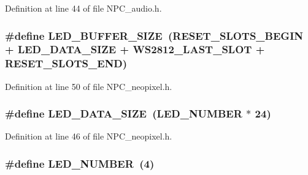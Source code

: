 Definition at line 44 of file N\+P\+C\+\_\+audio.\+h.

\subsubsection[{\texorpdfstring{L\+E\+D\+\_\+\+B\+U\+F\+F\+E\+R\+\_\+\+S\+I\+ZE}{LED_BUFFER_SIZE}}]{\setlength{\rightskip}{0pt plus 5cm}\#define L\+E\+D\+\_\+\+B\+U\+F\+F\+E\+R\+\_\+\+S\+I\+ZE~({\bf R\+E\+S\+E\+T\+\_\+\+S\+L\+O\+T\+S\+\_\+\+B\+E\+G\+IN} + {\bf L\+E\+D\+\_\+\+D\+A\+T\+A\+\_\+\+S\+I\+ZE} + {\bf W\+S2812\+\_\+\+L\+A\+S\+T\+\_\+\+S\+L\+OT} + {\bf R\+E\+S\+E\+T\+\_\+\+S\+L\+O\+T\+S\+\_\+\+E\+ND})}\hypertarget{group___constant_ga398165d967d8a2c8ff57ddd0a081a5ff}{}\label{group___constant_ga398165d967d8a2c8ff57ddd0a081a5ff}


Definition at line 50 of file N\+P\+C\+\_\+neopixel.\+h.

\subsubsection[{\texorpdfstring{L\+E\+D\+\_\+\+D\+A\+T\+A\+\_\+\+S\+I\+ZE}{LED_DATA_SIZE}}]{\setlength{\rightskip}{0pt plus 5cm}\#define L\+E\+D\+\_\+\+D\+A\+T\+A\+\_\+\+S\+I\+ZE~({\bf L\+E\+D\+\_\+\+N\+U\+M\+B\+ER} $\ast$ 24)}\hypertarget{group___constant_ga7af472c9efcf021651c589bb54d103fa}{}\label{group___constant_ga7af472c9efcf021651c589bb54d103fa}


Definition at line 46 of file N\+P\+C\+\_\+neopixel.\+h.

\subsubsection[{\texorpdfstring{L\+E\+D\+\_\+\+N\+U\+M\+B\+ER}{LED_NUMBER}}]{\setlength{\rightskip}{0pt plus 5cm}\#define L\+E\+D\+\_\+\+N\+U\+M\+B\+ER~(4)}\hypertarget{group___constant_ga306db1a2fccc9c26ad114b50a88940d3}{}\label{group___constant_ga306db1a2fccc9c26ad114b50a88940d3}


